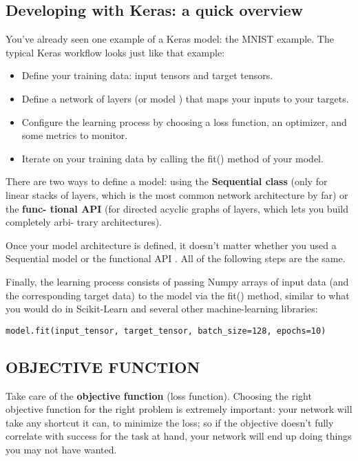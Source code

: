 \documentclass[11pt]{article}
\providecommand{\tightlist}{%
      \setlength{\itemsep}{0pt}\setlength{\parskip}{0pt}}
\begin{document}
    \hypertarget{developing-with-keras-a-quick-overview}{%
\subsection{Developing with Keras: a quick
overview}\label{developing-with-keras-a-quick-overview}}

You've already seen one example of a Keras model: the MNIST example. The
typical Keras workflow looks just like that example:

\begin{itemize}
\tightlist
\item
  Define your training data: input tensors and target tensors.
\item
  Define a network of layers (or model ) that maps your inputs to your
  targets.
\item
  Configure the learning process by choosing a loss function, an
  optimizer, and some metrics to monitor.
\item
  Iterate on your training data by calling the fit() method of your
  model.
\end{itemize}

There are two ways to define a model: using the \textbf{Sequential
class} (only for linear stacks of layers, which is the most common
network architecture by far) or the \textbf{func- tional API} (for
directed acyclic graphs of layers, which lets you build completely arbi-
trary architectures).

Once your model architecture is defined, it doesn't matter whether you
used a Sequential model or the functional API . All of the following
steps are the same.

Finally, the learning process consists of passing Numpy arrays of input
data (and the corresponding target data) to the model via the fit()
method, similar to what you would do in Scikit-Learn and several other
machine-learning libraries:

\texttt{model.fit(input\_tensor,\ target\_tensor,\ batch\_size=128,\ epochs=10)}

\hypertarget{objective-function}{%
\subsection{OBJECTIVE FUNCTION}\label{objective-function}}

Take care of the \textbf{objective function} (loss function). Choosing
the right objective function for the right problem is extremely
important: your network will take any shortcut it can, to minimize the
loss; so if the objective doesn't fully correlate with success for the
task at hand, your network will end up doing things you may not have
wanted.
\end{document}
